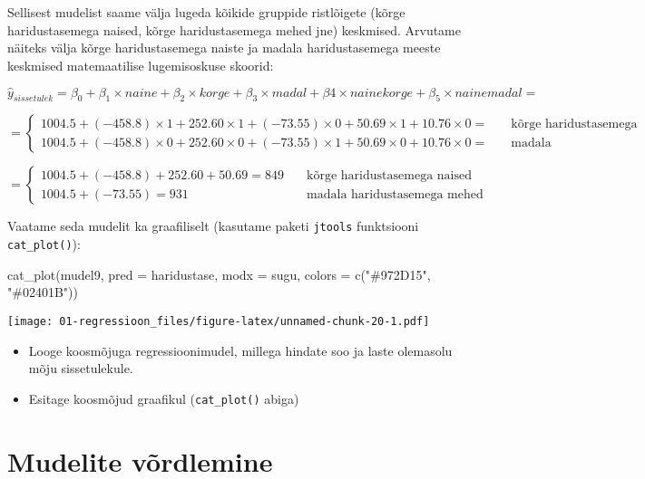 \documentclass[
]{book}
\newenvironment{Shaded}{\begin{snugshade}}{\end{snugshade}}
\newcommand{\AttributeTok}[1]{\textcolor[rgb]{0.77,0.63,0.00}{#1}}
\newcommand{\FunctionTok}[1]{\textcolor[rgb]{0.00,0.00,0.00}{#1}}
\newcommand{\NormalTok}[1]{#1}
\newcommand{\StringTok}[1]{\textcolor[rgb]{0.31,0.60,0.02}{#1}}
\providecommand{\tightlist}{%
  \setlength{\itemsep}{0pt}\setlength{\parskip}{0pt}}
\begin{document}
Sellisest mudelist saame välja lugeda kõikide gruppide ristlõigete (kõrge haridustasemega naised, kõrge haridustasemega mehed jne) keskmised. Arvutame näiteks välja kõrge haridustasemega naiste ja madala haridustasemega meeste keskmised matemaatilise lugemisoskuse skoorid:

\[\hat{y}_{sissetulek}=\beta_0+\beta_1 \times naine + \beta_2 \times korge + \beta_3 \times madal + \beta4 \times nainekorge + \beta_5 \times nainemadal =\]

\[ 
=
  \begin{cases}
    1004.5+(-458.8) \times 1 + 252.60 \times 1 + (-73.55) \times 0 + 50.69 \times 1 + 10.76 \times 0 = & \quad \text{kõrge haridustasemega naised}\\
    1004.5+(-458.8) \times 0 + 252.60 \times 0 + (-73.55) \times 1 + 50.69 \times 0 + 10.76 \times 0 = & \quad \text{madala haridustasemega mehed}
  \end{cases}
\]

\[ 
=
  \begin{cases}
    1004.5+(-458.8) + 252.60 + 50.69 =  849 & \quad \text{kõrge haridustasemega naised}\\
    1004.5 + (-73.55) = 931 & \quad \text{madala haridustasemega mehed}
  \end{cases}
\]

Vaatame seda mudelit ka graafiliselt (kasutame paketi \texttt{jtools} funktsiooni \texttt{cat\_plot()}):

\begin{Shaded}
\begin{Highlighting}[]
\FunctionTok{cat\_plot}\NormalTok{(mudel9, }\AttributeTok{pred =}\NormalTok{ haridustase, }\AttributeTok{modx =}\NormalTok{ sugu, }\AttributeTok{colors =}  \FunctionTok{c}\NormalTok{(}\StringTok{"\#972D15"}\NormalTok{, }\StringTok{"\#02401B"}\NormalTok{))}
\end{Highlighting}
\end{Shaded}

\texttt{[image: 01-regressioon\_files/figure-latex/unnamed-chunk-20-1.pdf]}

\begin{itemize}
\tightlist
\item
  Looge koosmõjuga regressioonimudel, millega hindate soo ja laste olemasolu mõju sissetulekule.
\item
  Esitage koosmõjud graafikul (\texttt{cat\_plot()} abiga)
\end{itemize}

\hypertarget{mudelite-vuxf5rdlemine}{%
\section{Mudelite võrdlemine}\label{mudelite-vuxf5rdlemine}}
\end{document}
